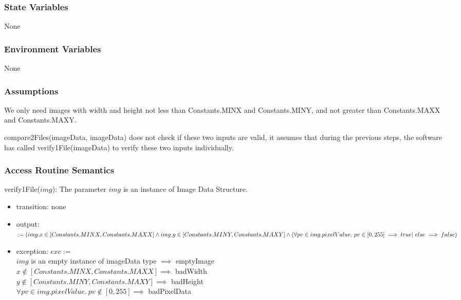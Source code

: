 \documentclass[12pt, titlepage]{article}
\begin{document}
\subsubsection{State Variables}

None

\subsubsection{Environment Variables}

None

\subsubsection{Assumptions}

We only need images with width and height not less than Constants.MINX and
Constants.MINY, and not greater than Constants.MAXX and Constants.MAXY.

compare2Files(imageData, imageData) does not check if these two inputs are
valid, it assumes that during the previous steps, the software has called
verify1File(imageData) to verify these two inputs individually. 

\subsubsection{Access Routine Semantics}

\noindent verify1File($img$):
The parameter $img$ is an instance of Image Data Structure.
\begin{itemize}
\item transition: none
\item output: $:= (img.x \in [Constants.MINX,Constants.MAXX] \land img.y \in
[Constants.MINY,\\
Constants.MAXY] \land
(\forall pv \in img.pixelValue.\ pv \in [0,255] \implies true |\ else \implies
false)$
\item exception: $exc :=$\\
$img$ is an empty instance of imageData type $\implies$ emptyImage\\
$x \not\in [Constants.MINX,Constants.MAXX] \implies$ badWidth\\
$y \not\in [Constants.MINY,Constants.MAXY] \implies$ badHeight\\
$\forall pv \in img.pixelValue.\ pv \not\in [0,255] \implies$ badPixelData
\end{itemize}
\end{document}
